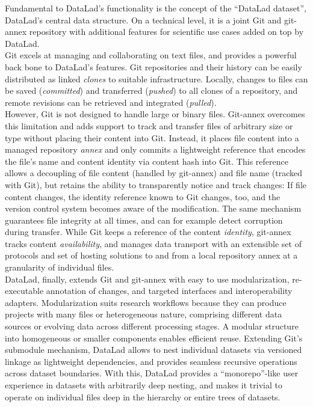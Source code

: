 {Fundamental to DataLad's functionality is the concept of the ``DataLad dataset'', DataLad's central data structure.
On a technical level, it is a joint Git and git-annex repository with additional features for scientific use cases added on top by DataLad.\\
Git excels at managing and collaborating on text files, and provides a powerful back bone to DataLad's features.
Git repositories and their history can be easily distributed as linked \textit{clones} to suitable infrastructure.
Locally, changes to files can be saved (\textit{committed}) and transferred (\textit{pushed}) to all clones of a repository, and remote revisions can be retrieved and integrated (\textit{pulled}).\\
However, Git is not designed to handle large or binary files.
Git-annex overcomes this limitation and adds support to track and transfer files of arbitrary size or type without placing their content into Git.
Instead, it places file content into a managed repository \textit{annex} and only commits a lightweight reference that encodes the file's name and content identity via content hash into Git.
This reference allows a decoupling of file content (handled by git-annex) and file name (tracked with Git), but retains the ability to transparently notice and track changes: If file content changes, the identity reference known to Git changes, too, and the version control system becomes aware of the modification.
The same mechanism guarantees file integrity at all times, and can for example detect corruption during transfer.
While Git keeps a reference of the content \textit{identity}, git-annex tracks content \textit{availability}, and manages data transport with an extensible set of protocols and set of hosting solutions to and from a local repository annex at a granularity of individual files. \\
DataLad, finally, extends Git and git-annex with easy to use modularization, re-executable annotation of changes, and targeted interfaces and interoperability adapters.
Modularization suits research workflows because they can produce projects with many files or heterogeneous nature, comprising different data sources or evolving data across different processing stages.
A modular structure into homogeneous or smaller components enables efficient reuse.
Extending Git’s submodule mechanism, DataLad allows to nest individual datasets via versioned linkage as lightweight dependencies, and provides seamless recursive operations across dataset boundaries.
With this, DataLad provides a ``monorepo''-like user experience in datasets with arbitrarily deep nesting, and makes it trivial to operate on individual files deep in the hierarchy or entire trees of datasets.
}
